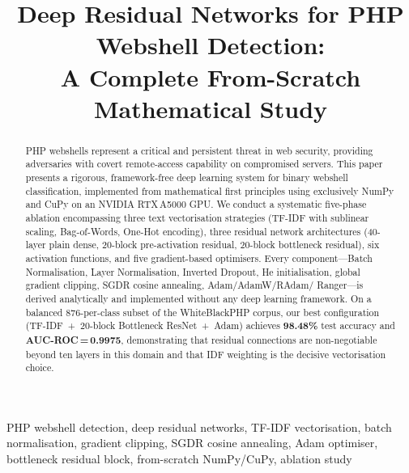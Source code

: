 \documentclass[10pt,conference,letterpaper]{IEEEtran}
\begin{document}
\title{\textcolor{ieeeblue}{\textbf{Deep Residual Networks for PHP Webshell Detection:\\
A Complete From-Scratch Mathematical Study}}}

\author{
}

\maketitle

\begin{abstract}
PHP webshells represent a critical and persistent threat in web security, providing
adversaries with covert remote-access capability on compromised servers. This paper
presents a rigorous, framework-free deep learning system for binary webshell
classification, implemented from mathematical first principles using exclusively
NumPy and CuPy on an NVIDIA RTX\,A5000 GPU. We conduct a systematic five-phase
ablation encompassing three text vectorisation strategies (TF-IDF with sublinear
scaling, Bag-of-Words, One-Hot encoding), three residual network architectures
(40-layer plain dense, 20-block pre-activation residual, 20-block bottleneck
residual), six activation functions, and five gradient-based optimisers. Every
component---Batch Normalisation, Layer Normalisation, Inverted Dropout, He
initialisation, global gradient clipping, SGDR cosine annealing, Adam/AdamW/RAdam/
Ranger---is derived analytically and implemented without any deep learning
framework. On a balanced 876-per-class subset of the WhiteBlackPHP corpus,
our best configuration (TF-IDF~+~20-block Bottleneck ResNet~+~Adam) achieves
\textbf{98.48\%} test accuracy and \textbf{AUC-ROC\,=\,0.9975}, demonstrating
that residual connections are non-negotiable beyond ten layers in this domain
and that IDF weighting is the decisive vectorisation choice.
\end{abstract}

\begin{IEEEkeywords}
PHP webshell detection, deep residual networks, TF-IDF vectorisation,
batch normalisation, gradient clipping, SGDR cosine annealing, Adam optimiser,
bottleneck residual block, from-scratch NumPy/CuPy, ablation study
\end{IEEEkeywords}
\end{document}
